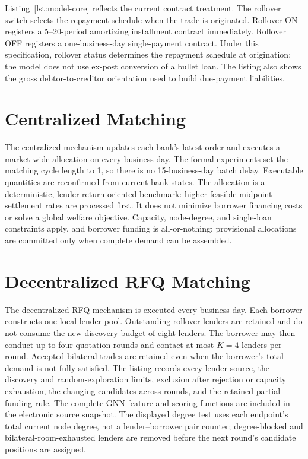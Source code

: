 Listing~\ref{lst:model-core} reflects the current contract treatment. The
rollover switch selects the repayment schedule when the trade is originated.
Rollover ON registers a 5--20-period amortizing installment contract
immediately. Rollover OFF registers a one-business-day single-payment
contract. Under this specification, rollover status determines the repayment
schedule at origination; the model does not use ex-post conversion of a bullet
loan. The listing also shows the gross debtor-to-creditor orientation used to
build due-payment liabilities.



\section{Centralized Matching}

The centralized mechanism updates each bank's latest order and executes a
market-wide allocation on every business day. The formal experiments set the
matching cycle length to 1, so there is no 15-business-day batch delay.
Executable quantities are reconfirmed from current bank states. The allocation
is a deterministic, lender-return-oriented benchmark: higher feasible midpoint
settlement rates are processed first. It does not minimize borrower financing
costs or solve a global welfare objective. Capacity, node-degree, and
single-loan constraints apply, and borrower funding is all-or-nothing:
provisional allocations are committed only when complete demand can be
assembled.



\section{Decentralized RFQ Matching}

The decentralized RFQ mechanism is executed every business day. Each borrower
constructs one local lender pool. Outstanding rollover lenders are retained
and do not consume the new-discovery budget of eight lenders. The borrower may
then conduct up to four quotation rounds and contact at most \(K=4\) lenders
per round. Accepted bilateral trades are retained even when the borrower's
total demand is not fully satisfied. The listing records every lender source,
the discovery and random-exploration limits, exclusion after rejection or
capacity exhaustion, the changing candidates across rounds, and the retained
partial-funding rule. The complete GNN feature and scoring functions are
included in the electronic source snapshot. The displayed degree test uses
each endpoint's total current node degree, not a lender--borrower pair counter;
degree-blocked and bilateral-room-exhausted lenders are removed before the
next round's candidate positions are assigned.

